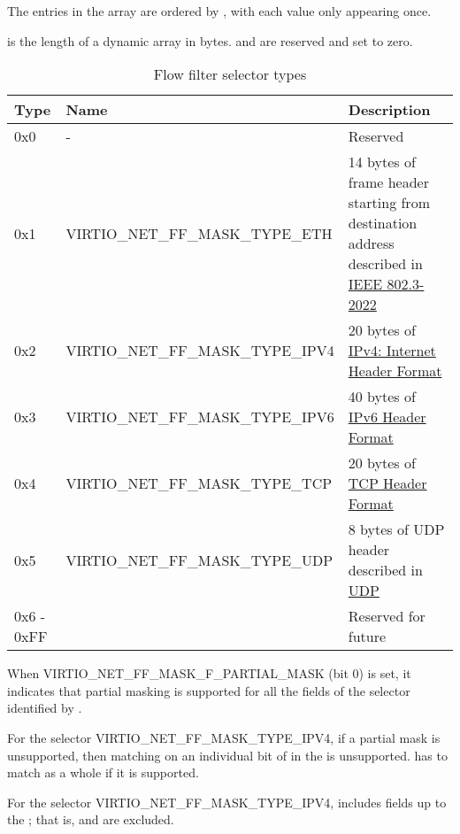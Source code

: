 The entries in the array  are ordered by
, with each  value only appearing once.

 is the length of a dynamic array  in bytes.
 and  are reserved and set to zero.

\begin{table}[H]
\caption{Flow filter selector types}
\label{table:Device Types / Network Device / Device Operation / Flow filter / Device and driver capabilities / VIRTIO-NET-FF-SELECTOR-CAP / flow filter selector types}
\begin{tabularx}{\textwidth}{ |l|X|X| }
\hline
Type & Name & Description \\
\hline \hline
0x0 & - & Reserved \\
\hline
0x1 & VIRTIO_NET_FF_MASK_TYPE_ETH & 14 bytes of frame header starting from destination address described in \hyperref[intro:IEEE 802.3-2022]{IEEE 802.3-2022} \\
\hline
0x2 & VIRTIO_NET_FF_MASK_TYPE_IPV4 & 20 bytes of \hyperref[intro:Internet-Header-Format]{IPv4: Internet Header Format} \\
\hline
0x3 & VIRTIO_NET_FF_MASK_TYPE_IPV6 & 40 bytes of \hyperref[intro:IPv6-Header-Format]{IPv6 Header Format} \\
\hline
0x4 & VIRTIO_NET_FF_MASK_TYPE_TCP & 20 bytes of \hyperref[intro:TCP-Header-Format]{TCP Header Format} \\
\hline
0x5 & VIRTIO_NET_FF_MASK_TYPE_UDP & 8 bytes of UDP header described in \hyperref[intro:UDP]{UDP} \\
\hline
0x6 - 0xFF & & Reserved for future \\
\hline
\end{tabularx}
\end{table}

When VIRTIO_NET_FF_MASK_F_PARTIAL_MASK (bit 0) is set, it indicates that
partial masking is supported for all the fields of the selector identified by .

For the selector  VIRTIO_NET_FF_MASK_TYPE_IPV4, if a partial mask is unsupported,
then matching on an individual bit of  in the
 is unsupported.  has to match as a whole
if it is supported.

For the selector  VIRTIO_NET_FF_MASK_TYPE_IPV4,  includes fields
up to the ; that is,  and
 are excluded.

